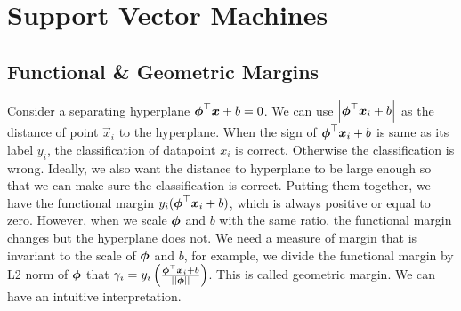 
\graphicspath{{Chapter08/Figs/}}

\chapter{Support Vector Machines}
\label{chapter8}



\section{Functional \& Geometric Margins}
\label{section8.1}

Consider a separating hyperplane $\boldsymbol{\phi}^\top\boldsymbol{x}+b=0$. We can use $\left\vert\boldsymbol{\phi}^\top\boldsymbol{x}_i+b\right\vert$ as the distance of point $\vec{x}_i$ to the hyperplane. When the sign of $\boldsymbol{\phi}^\top\boldsymbol{x}_i+b$ is same as its label $y_i$, the classification of datapoint $x_i$ is correct. Otherwise the classification is wrong. Ideally, we also want the distance to hyperplane to be large enough so that we can make sure the classification is correct. Putting them together, we have the functional margin $y_i(\boldsymbol{\phi}^\top\boldsymbol{x}_i+b)$, which is always positive or equal to zero. However, when we scale $\boldsymbol{\phi}$ and $b$ with the same ratio, the functional margin changes but the hyperplane does not. We need a measure of margin that is invariant to the scale of $\boldsymbol{\phi}$ and $b$, for example, we divide the functional margin by L2 norm of $\boldsymbol{\phi}$ that $\gamma_i=y_i\left(\frac{\boldsymbol{\phi}^\top\boldsymbol{x}_i+b}{\left\vert\left\vert \boldsymbol{\phi} \right\vert\right\vert}\right)$. This is called geometric margin. We can have an intuitive interpretation.

